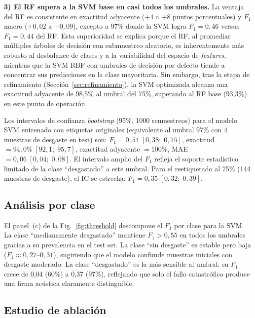 \documentclass[10pt,twocolumn]{article}
\begin{document}
\textbf{3) El RF supera a la SVM base en casi todos los umbrales.} La ventaja
del RF es consistente en exactitud adyacente ($+4$ a $+8$ puntos
porcentuales) y $F_1$ macro ($+0{,}02$ a $+0{,}09$), excepto a 97\%
donde la SVM logra $F_1 = 0{,}46$ versus $F_1 = 0{,}44$ del RF. Esta
superioridad se explica porque el RF, al promediar múltiples árboles de
decisión con submuestreo aleatorio, es inherentemente más robusto al
desbalance de clases y a la variabilidad del espacio de \textit{features},
mientras que la SVM RBF con umbrales de decisión por defecto tiende a
concentrar sus predicciones en la clase mayoritaria. Sin embargo, tras la
etapa de refinamiento (Sección~\ref{sec:refinamiento}), la SVM optimizada
alcanza una exactitud adyacente de 98{,}5\% al umbral del 75\%,
superando al RF base (93{,}3\%) en este punto de operación.

Los intervalos de confianza \textit{bootstrap} (95\%, 1000 remuestreos)
para el modelo SVM entrenado con etiquetas originales (equivalente al
umbral 97\% con 4 muestras de desgaste en test) son:
$F_1 = 0{,}54\; [0{,}38;\; 0{,}75]$,
exactitud $= 94{,}0\%\; [92{,}1;\; 95{,}7]$,
exactitud adyacente $= 100\%$, MAE $= 0{,}06\; [0{,}04;\; 0{,}08]$.
El intervalo amplio del $F_1$ refleja el soporte estadístico limitado de la
clase ``desgastado'' a este umbral. Para el reetiquetado al 75\% (144
muestras de desgaste), el IC se estrecha: $F_1 = 0{,}35\; [0{,}32;\; 0{,}39]$.

\subsection{Análisis por clase}

El panel~(c) de la Fig.~\ref{fig:threshold} descompone el $F_1$ por clase
para la SVM. La clase ``medianamente desgastado'' mantiene $F_1 > 0{,}55$
en todos los umbrales gracias a su prevalencia en el test set. La clase
``sin desgaste'' es estable pero baja ($F_1 \approx 0{,}27\text{--}0{,}31$),
sugiriendo que el modelo confunde muestras iniciales con desgaste moderado.
La clase ``desgastado'' es la más sensible al umbral: su $F_1$ crece de
0{,}04 (60\%) a 0{,}37 (97\%), reflejando que solo el fallo catastrófico
produce una firma acústica claramente distinguible.

\subsection{Estudio de ablación}
\end{document}
